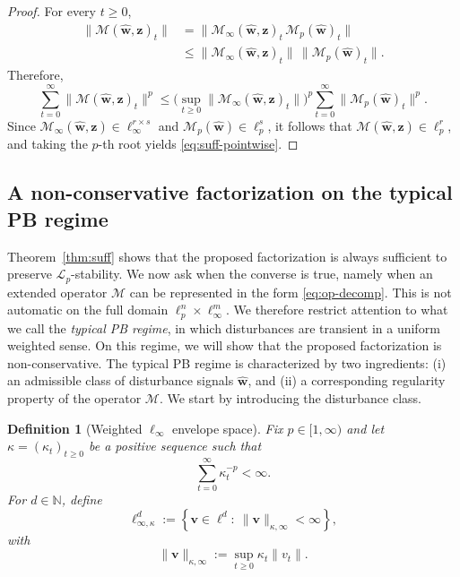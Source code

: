\documentclass[journal,twoside,web]{ieeecolor}
\newtheorem{definition}{Definition}
\newcommand{\disturbance}{\mathbf{\widehat w}}
\newcommand{\operator}{\mathcal{M}}
\begin{document}
\begin{proof}
For every \(t\ge 0\),
\begin{align*}
\|\operator(\disturbance,\mathbf z)_t\|
& =
\|\operator_\infty(\disturbance,\mathbf z)_t\,
\operator_p(\disturbance)_t\| \\
& \le
\|\operator_\infty(\disturbance,\mathbf z)_t\|\,
\|\operator_p(\disturbance)_t\|.
\end{align*}
Therefore,
\[
\sum_{t=0}^\infty \|\operator(\disturbance,\mathbf z)_t\|^p
\le
\Big(\sup_{t\ge 0}\|\operator_\infty(\disturbance,\mathbf z)_t\|\Big)^p
\sum_{t=0}^\infty \|\operator_p(\disturbance)_t\|^p.
\]
Since \(\operator_\infty(\disturbance,\mathbf z)\in\ell_\infty^{r\times s}\) and
\(\operator_p(\disturbance)\in\ell_p^s\), it follows that
\(\operator(\disturbance,\mathbf z)\in\ell_p^r\), and taking the \(p\)-th root yields
\eqref{eq:suff-pointwise}.
\end{proof}

\subsection{A non-conservative factorization on the typical PB regime}

Theorem~\ref{thm:suff} shows that the proposed factorization is always sufficient to preserve
\(\mathcal L_p\)-stability. We now ask when the converse is true, namely when an extended operator
\(\operator\) can be represented in the form \eqref{eq:op-decomp}. This is not automatic on the full
domain \(\ell_p^n\times \ell_\infty^m\). We therefore restrict attention to what we call the
\emph{typical PB regime}, in which disturbances are transient in a uniform weighted sense. On this
regime, we will show that the proposed factorization is non-conservative. The typical PB regime is
characterized by two ingredients: (i) an admissible class of disturbance signals \(\disturbance\),
and (ii) a corresponding regularity property of the operator \(\operator\). We start by introducing
the disturbance class.

\begin{definition}[Weighted \texorpdfstring{$\ell_\infty$}{linfty} envelope space]
\label{def:ellinfty-kappa}
Fix \(p\in[1,\infty)\) and let \(\kappa=(\kappa_t)_{t\ge 0}\) be a positive sequence such that
\begin{equation}\label{eq:kappa-summable}
\sum_{t=0}^{\infty}\kappa_t^{-p}<\infty.
\end{equation}
For \(d\in\mathbb N\), define
\[
\ell_{\infty,\kappa}^d
:=
\left\{
\mathbf v\in \ell^d:\ \|\mathbf v\|_{\kappa,\infty}<\infty
\right\},
\]
with
\[
\|\mathbf v\|_{\kappa,\infty}
:=
\sup_{t\ge 0}\kappa_t\|v_t\|.
\]
\end{definition}
\end{document}
